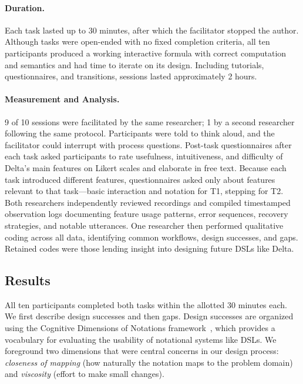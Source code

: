 \paragraph{Duration.}
Each task lasted up to 30 minutes, after which the facilitator stopped the author. Although tasks were open-ended with no fixed completion criteria, all ten participants produced a working interactive formula with correct computation and semantics and had time to iterate on its design. Including tutorials, questionnaires, and transitions, sessions lasted approximately 2 hours.

\paragraph{Measurement and Analysis.}
9 of 10 sessions were facilitated by the same researcher; 1 by a second researcher following the same protocol. Participants were told to think aloud, and the facilitator could interrupt with process questions. Post-task questionnaires after each task asked participants to rate usefulness, intuitiveness, and difficulty of Delta's main features on Likert scales and elaborate in free text. Because each task introduced different features, questionnaires asked only about features relevant to that task---basic interaction and notation for T1, stepping for T2. Both researchers independently reviewed recordings and compiled timestamped observation logs documenting feature usage patterns, error sequences, recovery strategies, and notable utterances. One researcher then performed qualitative coding across all data, identifying common workflows, design successes, and gaps. Retained codes were those lending insight into designing future DSLs like Delta.

\subsection{Results}

All ten participants completed both tasks within the allotted 30 minutes each.
We first describe design successes and then gaps. Design successes are organized using the Cognitive Dimensions of Notations framework~\cite{Blackwell2003-gv}, which provides a vocabulary for evaluating the usability of notational systems like DSLs. We foreground two dimensions that were central concerns in our design process: \emph{closeness of mapping} (how naturally the notation maps to the problem domain) and \emph{viscosity} (effort to make small changes).

